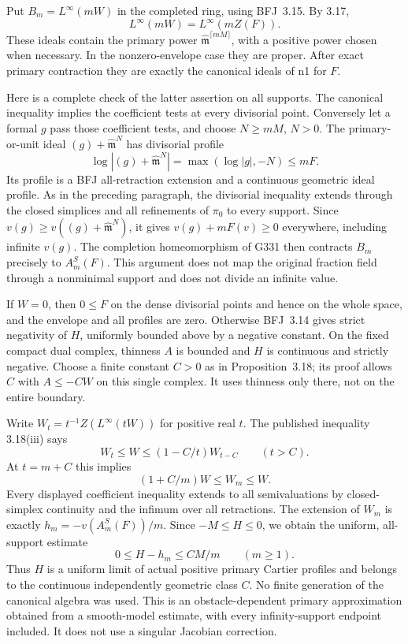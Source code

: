 \documentclass[11pt]{article}
\begin{document}
Put $B_m=L^\infty(mW)$ in the completed ring, using BFJ~3.15. By 3.17,
\[
 L^\infty(mW)=L^\infty(mZ(F)). \tag{7}
\]
These ideals contain the primary power $\widehat{\mathfrak m}^{\lceil mM\rceil}$, with a positive power chosen when necessary. In the nonzero-envelope case they are proper. After exact primary contraction they are exactly the canonical ideals of n1 for $F$.

Here is a complete check of the latter assertion on all supports. The canonical inequality implies the coefficient tests at every divisorial point. Conversely let a formal $g$ pass those coefficient tests, and choose $N\ge mM$, $N>0$. The primary-or-unit ideal $(g)+\widehat{\mathfrak m}^N$ has divisorial profile
\[
 \log|(g)+\widehat{\mathfrak m}^N|=\max(\log|g|,-N)\le mF.
\]
Its profile is a BFJ all-retraction extension and a continuous geometric ideal profile. As in the preceding paragraph, the divisorial inequality extends through the closed simplices and all refinements of $\pi_0$ to every support. Since $v(g)\ge v((g)+\widehat{\mathfrak m}^N)$, it gives $v(g)+mF(v)\ge0$ everywhere, including infinite $v(g)$. The completion homeomorphism of G331 then contracts $B_m$ precisely to $A_m^S(F)$. This argument does not map the original fraction field through a nonminimal support and does not divide an infinite value.

If $W=0$, then $0\le F$ on the dense divisorial points and hence on the whole space, and the envelope and all profiles are zero. Otherwise BFJ~3.14 gives strict negativity of $H$, uniformly bounded above by a negative constant. On the fixed compact dual complex, thinness $A$ is bounded and $H$ is continuous and strictly negative. Choose a finite constant $C>0$ as in Proposition~3.18; its proof allows $C$ with $A\le-CW$ on this single complex. It uses thinness only there, not on the entire boundary.

Write $W_t=t^{-1}Z(L^\infty(tW))$ for positive real $t$. The published inequality 3.18(iii) says
\[
 W_t\le W\le (1-C/t)W_{t-C}\qquad(t>C).
\] At $t=m+C$ this implies
\[
 (1+C/m)W\le W_m\le W.
\]
Every displayed coefficient inequality extends to all semivaluations by closed-simplex continuity and the infimum over all retractions. The extension of $W_m$ is exactly $h_m=-v(A_m^S(F))/m$. Since $-M\le H\le0$, we obtain the uniform, all-support estimate
\[
 0\le H-h_m\le CM/m\qquad(m\ge1). \tag{8}
\]
Thus $H$ is a uniform limit of actual positive primary Cartier profiles and belongs to the continuous independently geometric class $C$. No finite generation of the canonical algebra was used. This is an obstacle-dependent primary approximation obtained from a smooth-model estimate, with every infinity-support endpoint included. It does not use a singular Jacobian correction.
\end{document}
